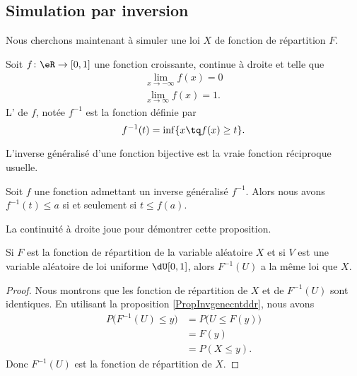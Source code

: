 \subsection{Simulation par inversion}

Nous cherchons maintenant à simuler une loi \( X\) de fonction de répartition \( F\).

\begin{definition}
    Soit \( f\colon \eR\to \mathopen[ 0 , 1 \mathclose]\) une fonction croissante, continue à droite et telle que
    \begin{subequations}
        \begin{align}
            \lim_{x\to -\infty} f(x)=0\\
            \lim_{x\to \infty} f(x)=1.
        \end{align}
    \end{subequations}
    L' de \( f\), notée \( f^{-1}\) est la fonction définie par
    \begin{equation}
        f^{-1}(t)=\inf\{ x\tq f(x)\geq t \}.
    \end{equation}
\end{definition}

\begin{remark}
    L'inverse généralisé d'une fonction bijective est la vraie fonction réciproque usuelle.
\end{remark}

\begin{proposition}     \label{PropInvgenecntddr}
    Soit \( f\) une fonction admettant un inverse généralisé \( f^{-1}\). Alors nous avons \( f^{-1}(t)\leq a\) si et seulement si \( t\leq f(a)\).
\end{proposition}
La continuité à droite joue pour démontrer cette proposition.


\begin{proposition}
    Si \( F\) est la fonction de répartition de la variable aléatoire \( X\) et si \( V\) est une variable aléatoire de loi uniforme \( \dU\mathopen[ 0 , 1 \mathclose]\), alors \( F^{-1}(U)\) a la même loi que \( X\).
\end{proposition}

\begin{proof}
    Nous montrons que les fonction de répartition de \( X\) et de \( F^{-1}(U)\) sont identiques. En utilisant la proposition \ref{PropInvgenecntddr}, nous avons
    \begin{subequations}
        \begin{align}
            P\big( F^{-1}(U)\leq y \big)&=P\big( U\leq F(y) \big)\\
            &=F(y)\\
            &=P(X\leq y).
        \end{align}
    \end{subequations}
    Donc \( F^{-1}(U)\) est la fonction de répartition de \( X\).
\end{proof}

